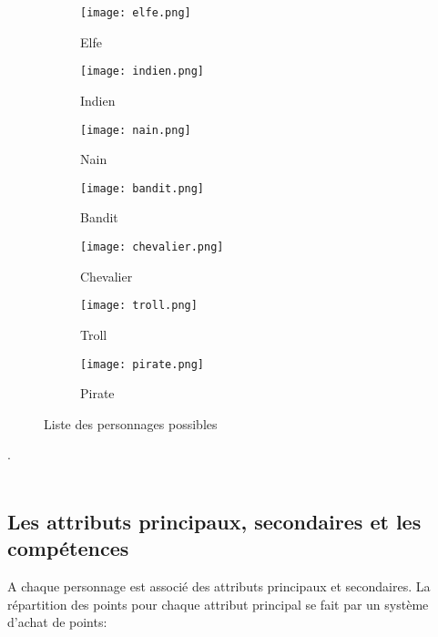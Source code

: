 \documentclass[a4paper,12pt]{report}
\begin{document}
	\begin{figure*}[h]
		\centering
		\begin{subfigure}[b]{0.2\linewidth}
			\centering
			\texttt{[image: elfe.png]}
			\caption{Elfe} 
		\end{subfigure}
		\begin{subfigure}[b]{0.2\linewidth}
			\centering
			\texttt{[image: indien.png]}
			\caption{Indien}
		\end{subfigure}
		\begin{subfigure}[b]{0.2\linewidth}
			\centering
			\texttt{[image: nain.png]}
			\caption{Nain}
		\end{subfigure}
		
		
		\begin{subfigure}[b]{0.2\linewidth}
			\centering
			\texttt{[image: bandit.png]}
			\caption{Bandit} 
		\end{subfigure}
		\begin{subfigure}[b]{0.2\linewidth}
			\centering
			\texttt{[image: chevalier.png]}
			\caption{Chevalier}
		\end{subfigure}
		\begin{subfigure}[b]{0.2\linewidth}
			\centering
			\texttt{[image: troll.png]}
			\caption{Troll}
		\end{subfigure}
		
		
		\begin{subfigure}[b]{0.2\linewidth}
			\centering
			\texttt{[image: pirate.png]}
			\caption{Pirate}
		\end{subfigure}

		\caption{Liste des personnages possibles}
	\end{figure*}



	. \\ \\ 
	
	\subsection{Les attributs principaux, secondaires et les compétences}
	

	\indent A chaque personnage est associé des attributs principaux et secondaires. La répartition des points pour chaque attribut principal se fait par un système d'achat de points:  
\end{document}
